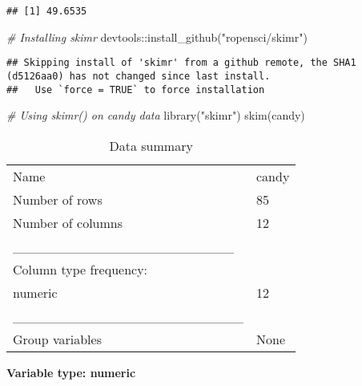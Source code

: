 \documentclass[
]{article}
\newenvironment{Shaded}{\begin{snugshade}}{\end{snugshade}}
\newcommand{\CommentTok}[1]{\textcolor[rgb]{0.56,0.35,0.01}{\textit{#1}}}
\newcommand{\FunctionTok}[1]{\textcolor[rgb]{0.00,0.00,0.00}{#1}}
\newcommand{\NormalTok}[1]{#1}
\newcommand{\SpecialCharTok}[1]{\textcolor[rgb]{0.00,0.00,0.00}{#1}}
\newcommand{\StringTok}[1]{\textcolor[rgb]{0.31,0.60,0.02}{#1}}
\begin{document}
\begin{verbatim}
## [1] 49.6535
\end{verbatim}

\begin{Shaded}
\begin{Highlighting}[]
\CommentTok{\# Installing skimr}
\NormalTok{devtools}\SpecialCharTok{::}\FunctionTok{install\_github}\NormalTok{(}\StringTok{"ropensci/skimr"}\NormalTok{)}
\end{Highlighting}
\end{Shaded}

\begin{verbatim}
## Skipping install of 'skimr' from a github remote, the SHA1 (d5126aa0) has not changed since last install.
##   Use `force = TRUE` to force installation
\end{verbatim}

\begin{Shaded}
\begin{Highlighting}[]
\CommentTok{\# Using skimr() on candy data}
\FunctionTok{library}\NormalTok{(}\StringTok{"skimr"}\NormalTok{)}
\FunctionTok{skim}\NormalTok{(candy)}
\end{Highlighting}
\end{Shaded}

\begin{longtable}[]{@{}ll@{}}
\caption{Data summary}\tabularnewline
\toprule()
\endhead
Name & candy \\
Number of rows & 85 \\
Number of columns & 12 \\
\_\_\_\_\_\_\_\_\_\_\_\_\_\_\_\_\_\_\_\_\_\_\_ & \\
Column type frequency: & \\
numeric & 12 \\
\_\_\_\_\_\_\_\_\_\_\_\_\_\_\_\_\_\_\_\_\_\_\_\_ & \\
Group variables & None \\
\bottomrule()
\end{longtable}

\textbf{Variable type: numeric}
\end{document}
